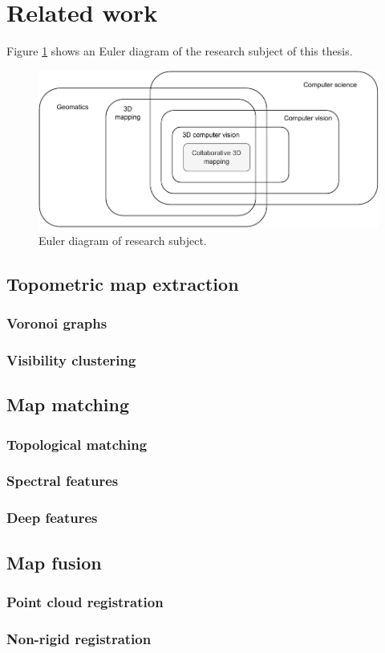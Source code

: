 \section{Related work}

Figure \ref{fig:euler} shows an Euler diagram of the research subject of this thesis.

\begin{figure}[h]
    \centering
    \includegraphics*[width=.8\textwidth]{./fig/euler_diagram.drawio.pdf}
    \caption{Euler diagram of research subject.}
    \label{fig:euler}
\end{figure}

\subsection{Topometric map extraction}
\subsubsection{Voronoi graphs}
\subsubsection{Visibility clustering}

\subsection{Map matching}
\subsubsection{Topological matching}
\subsubsection{Spectral features}
\subsubsection{Deep features}

\subsection{Map fusion}
\subsubsection{Point cloud registration}
\subsubsection{Non-rigid registration}
